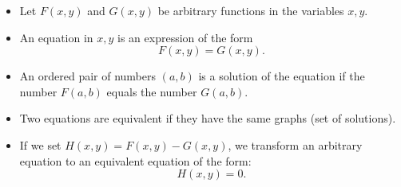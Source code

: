 \begin{frame}
\begin{itemize}
\item Let $F(x,y)$ and $G(x,y)$ be arbitrary functions in the variables $x,y$. 
\item<2-> An equation in $x,y$ is an expression of the form 
\[
F(x,y)=G(x,y).
\]
\item<3-> An ordered pair of numbers $(a,b)$ is a solution of the equation if the number $F(a,b)$ equals the number $G(a,b)$.
\end{itemize}
\begin{itemize}
\item<5-> Two equations are equivalent if they have the same graphs (set of solutions).
\item<6-> If we set $H(x,y)=F(x,y)-G(x,y)$, we transform an arbitrary equation to an equivalent equation of the form:
\[
H(x,y)=0.
\]
\end{itemize}
\end{frame}